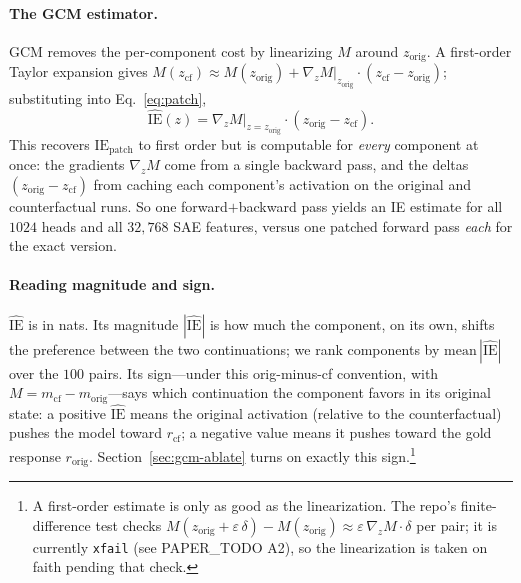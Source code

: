 \documentclass[11pt]{article}
\begin{document}
\paragraph{The GCM estimator.} GCM \citep{sankaranarayanan2026gcm} removes the
per-component cost by linearizing $M$ around $z_{\text{orig}}$. A first-order
Taylor expansion gives $M(z_{\text{cf}}) \approx M(z_{\text{orig}}) + \nabla_z
M|_{z_{\text{orig}}}\!\cdot(z_{\text{cf}} - z_{\text{orig}})$; substituting into
Eq.~\ref{eq:patch},
\begin{equation}
\widehat{\mathrm{IE}}(z) = \nabla_z M\big|_{z=z_{\text{orig}}} \cdot (z_{\text{orig}} - z_{\text{cf}}).
\label{eq:ie}
\end{equation}
This recovers $\mathrm{IE}_{\text{patch}}$ to first order but is computable for
\emph{every} component at once: the gradients $\nabla_z M$ come from a single
backward pass, and the deltas $(z_{\text{orig}} - z_{\text{cf}})$ from caching
each component's activation on the original and counterfactual runs. So one
forward$+$backward pass yields an IE estimate for all $1024$ heads and all
$32{,}768$ SAE features, versus one patched forward pass \emph{each} for the
exact version.

\paragraph{Reading magnitude and sign.} $\widehat{\mathrm{IE}}$ is in nats. Its
magnitude $|\widehat{\mathrm{IE}}|$ is how much the component, on its own, shifts
the preference between the two continuations; we rank components by
$\mathrm{mean}\,|\widehat{\mathrm{IE}}|$ over the $100$ pairs. Its sign---under
this orig-minus-cf convention, with $M = m_{\text{cf}} - m_{\text{orig}}$---says
which continuation the component favors in its original state: a positive
$\widehat{\mathrm{IE}}$ means the original activation (relative to the
counterfactual) pushes the model toward $r_{\text{cf}}$; a negative value means
it pushes toward the gold response $r_{\text{orig}}$. Section~\ref{sec:gcm-ablate}
turns on exactly this sign.\footnote{A first-order estimate is only as good as
the linearization. The repo's finite-difference test checks
$M(z_{\text{orig}}+\varepsilon\,\delta) - M(z_{\text{orig}}) \approx
\varepsilon\,\nabla_z M\cdot\delta$ per pair; it is currently \texttt{xfail}
(see PAPER\_TODO A2), so the linearization is taken on faith pending that check.}
\end{document}
